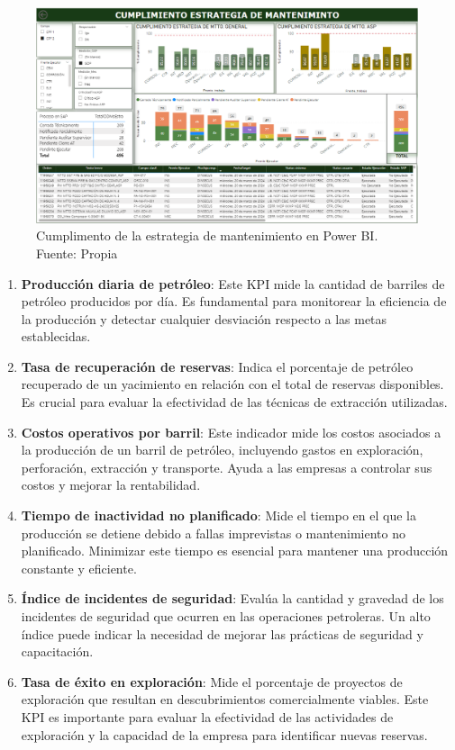 \documentclass[
  11pt,
  bookmarksnumbered]{article}
\begin{document}
\begin{figure}

{\centering \includegraphics[width=4.78in]{media/image3} 

}

\caption{Cumplimento de la estrategia de mantenimiento en Power BI. Fuente: Propia}\label{fig:unnamed-chunk-2}
\end{figure}

\newpage

\begin{enumerate}
\def\labelenumi{\arabic{enumi}.}
\setcounter{enumi}{2}
\item
  \textbf{Producción diaria de petróleo}: Este KPI mide la cantidad de barriles de petróleo producidos por día.
  Es fundamental para monitorear la eficiencia de la producción y detectar cualquier desviación respecto a las metas establecidas.
\item
  \textbf{Tasa de recuperación de reservas}: Indica el porcentaje de petróleo recuperado de un yacimiento en relación con el total de reservas disponibles.
  Es crucial para evaluar la efectividad de las técnicas de extracción utilizadas.
\item
  \textbf{Costos operativos por barril}: Este indicador mide los costos asociados a la producción de un barril de petróleo, incluyendo gastos en exploración, perforación, extracción y transporte.
  Ayuda a las empresas a controlar sus costos y mejorar la rentabilidad.
\item
  \textbf{Tiempo de inactividad no planificado}: Mide el tiempo en el que la producción se detiene debido a fallas imprevistas o mantenimiento no planificado.
  Minimizar este tiempo es esencial para mantener una producción constante y eficiente.
\item
  \textbf{Índice de incidentes de seguridad}: Evalúa la cantidad y gravedad de los incidentes de seguridad que ocurren en las operaciones petroleras.
  Un alto índice puede indicar la necesidad de mejorar las prácticas de seguridad y capacitación.
\item
  \textbf{Tasa de éxito en exploración}: Mide el porcentaje de proyectos de exploración que resultan en descubrimientos comercialmente viables.
  Este KPI es importante para evaluar la efectividad de las actividades de exploración y la capacidad de la empresa para identificar nuevas reservas.
\end{enumerate}
\end{document}
